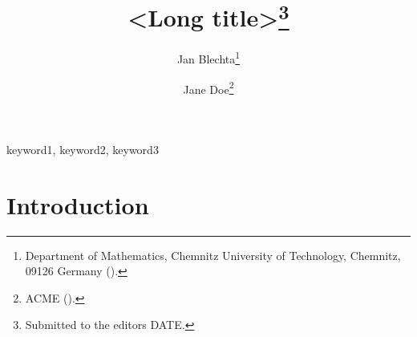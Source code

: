 \documentclass[review,onefignum,onetabnum,onealgnum]{siamart220329}
\title{%
  <Long title>\thanks{%
    Submitted to the editors DATE.
  }
}
\author{%
    Jan Blechta\thanks{%
    Department of Mathematics, Chemnitz University of Technology, Chemnitz, 09126 Germany
    (\email{jan.blechta@math.tu-chemnitz.de}).}
    \and
    Jane Doe\thanks{%
    ACME
    (\email{doe@acme.edu}).}
}
\begin{document}
\maketitle


\begin{abstract}
\end{abstract}


\begin{keywords}
  keyword1, keyword2, keyword3
\end{keywords}


\begin{MSCcodes}
\end{MSCcodes}


\tableofcontents


\section{Introduction}
\label{sec:intro}


\begingroup
\raggedbottom
{}


\endgroup
\end{document}
